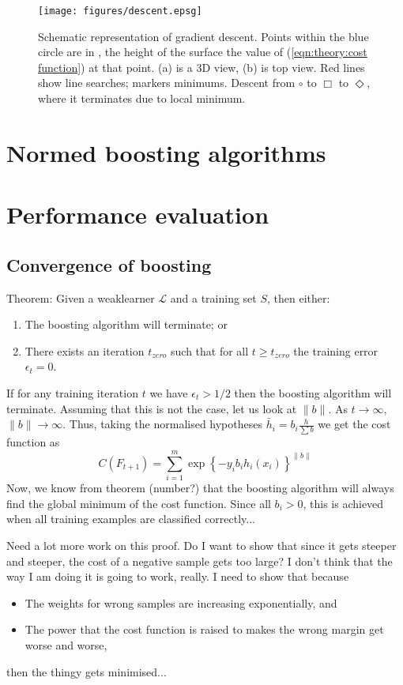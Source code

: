\begin{figure}
\begin{center}
\texttt{[image: figures/descent.epsg]}
\caption{Schematic representation of gradient descent.  Points within the blue
circle are in \calF, the height of the surface the value of
(\ref{eqn:theory:cost function}) at that point.  (a) is a 3D view, (b)
is top view. Red lines show line searches; markers minimums.  Descent
from $\circ$ to $\Box$ to $\Diamond$, where it terminates due to
local minimum.}
\label{fig:gradient descent}
\end{center}
\end{figure}


\section{Normed boosting algorithms}

\section{Performance evaluation}


\subsection{Convergence of boosting}
Theorem: Given a weaklearner $\mathcal{L}$ and a training set $S$,
then either:
\begin{enumerate}
\item	The boosting algorithm will terminate; or
\item	There exists an iteration $t_{zero}$ such that for all $t \geq
	t_{zero}$ the training error $\epsilon_t = 0$.
\end{enumerate}
If for any training iteration $t$ we have $\epsilon_t > 1/2$ then the
boosting algorithm will terminate.  Assuming that this is not the
case, let us look at $\|b\|$.  As $t \rightarrow \infty$, $\|b\|
\rightarrow \infty$.  Thus, taking the normalised hypotheses $\bar{h}_i
= b_i \frac{h}{\sum b}$ we get the cost function as
\[
C(F_{t+1}) = \sum_{i=1}^{m} \exp\left\{ -y_i b_i h_i(x_i)
\right\}^{\|b\|}
\]
Now, we know from theorem (number?) that the boosting algorithm will
always find the global minimum of the cost function.  Since all $b_i >
0$, this is achieved when all training examples are classified
correctly...

Need a lot more work on this proof.  Do I want to show that since it
gets steeper and steeper, the cost of a negative sample gets too
large?  I don't think that the way I am doing it is going to work,
really.  I need to show that because
\begin{itemize}
\item	The weights for wrong samples are increasing exponentially,
	and
\item	The power that the cost function is raised to makes the wrong
	margin get worse and worse,
\end{itemize}
then the thingy gets minimised...

